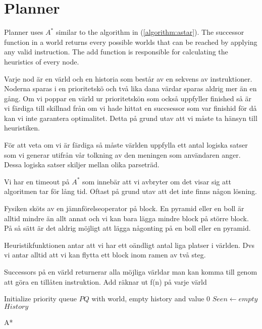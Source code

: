 \section{Planner}
Planner uses $A^*$ similar to the algorithm in (\ref{algorithm:astar}). The
successor function in a world returns every possible worlds that can be reached
by applying any valid instruction. The add function is responsible for
calculating the heuristics of every node.

Varje nod är en värld och en historia som består av en sekvens av instruktioner.
Noderna sparas i en prioritetskö och två lika dana värdar sparas aldrig mer än
en gång. Om vi poppar en värld ur prioritetskön som också uppfyller finished så är vi färdiga till
skillnad från om vi hade hittat en succsessor som var finishid för då kan vi inte
garantera optimalitet. Detta på grund utav att vi måste ta hänsyn till
heuristiken. 

För att veta om vi är färdiga så måste världen uppfylla ett antal logiska satser
som vi generar utifrån vår tolkning av den meningen som användaren anger. Dessa
logiska satser skiljer mellan olika parseträd.

Vi har en timeout på $A^*$ som innebär att vi avbryter om det visar sig att
algoritmen tar för lång tid. Oftast på grund utav att det inte finns någon
lösning. 

Fysiken sköts av en jämnförelseoperator på block. En pyramid eller en boll är alltid
mindre än allt annat och vi kan bara lägga mindre block på större block. På så
sätt är det aldrig möjligt att lägga någonting på en boll eller en pyramid.  


Heuristikfunktionen antar att vi har ett oändligt antal liga platser i världen.
Dvs vi antar alltid att vi kan flytta ett block inom ramen av två steg. 









Successors på en värld returnerar alla möjliga världar man kan komma till genom
att göra en tillåten instruktion. Add räknar ut f(n) på varje värld
\begin{algorithm}[h!]
 \SetAlgoLined
 Initialize priority queue $PQ$ with world, empty history and value 0\;
 $Seen \leftarrow empty$\;
 \Return $History$
 \caption{A*}
 \label{algorithm:astar}
\end{algorithm}

